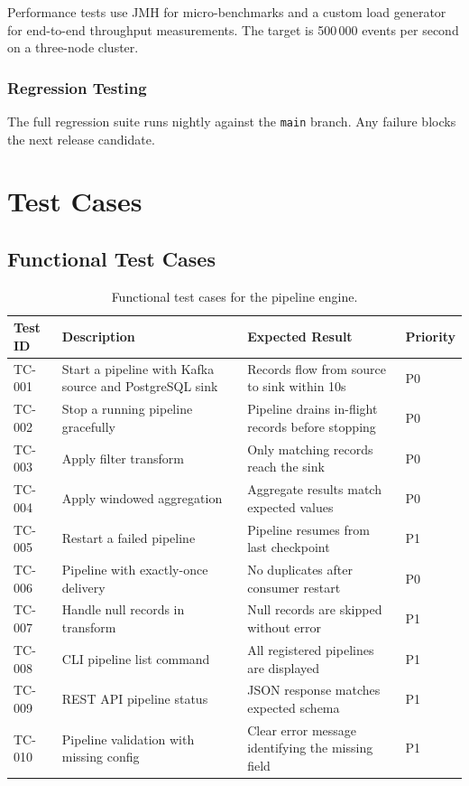 \documentclass[
    language=english,
    doctype=technical-report,
    institution=none,
    titlestyle=book,
    oneside,
]{../../omnilatex}
\begin{document}
Performance tests use JMH for micro-benchmarks and a custom load
generator for end-to-end throughput measurements. The target is
500\,000 events per second on a three-node cluster.

\subsection{Regression Testing}

The full regression suite runs nightly against the \texttt{main} branch.
Any failure blocks the next release candidate.

\chapter{Test Cases}
\label{sec:test-cases}

\section{Functional Test Cases}

\begin{table}[htbp]
    \centering
    \caption{Functional test cases for the pipeline engine.}
    \label{tab:func-tests}
    \begin{tabular}{@{}p{2.5cm}p{5cm}p{3cm}p{2cm}@{}}
        \toprule
        Test ID & Description & Expected Result & Priority \\
        \midrule
        TC-001 & Start a pipeline with Kafka source and
            PostgreSQL sink & Records flow from source to sink
            within 10s & P0 \\
        TC-002 & Stop a running pipeline gracefully &
            Pipeline drains in-flight records before stopping & P0 \\
        TC-003 & Apply filter transform & Only matching records
            reach the sink & P0 \\
        TC-004 & Apply windowed aggregation & Aggregate results
            match expected values & P0 \\
        TC-005 & Restart a failed pipeline & Pipeline resumes from
            last checkpoint & P1 \\
        TC-006 & Pipeline with exactly-once delivery & No duplicates
            after consumer restart & P0 \\
        TC-007 & Handle null records in transform & Null records are
            skipped without error & P1 \\
        TC-008 & CLI pipeline list command & All registered pipelines
            are displayed & P1 \\
        TC-009 & REST API pipeline status & JSON response matches
            expected schema & P1 \\
        TC-010 & Pipeline validation with missing config & Clear error
            message identifying the missing field & P1 \\
        \bottomrule
    \end{tabular}
\end{table}
\end{document}
